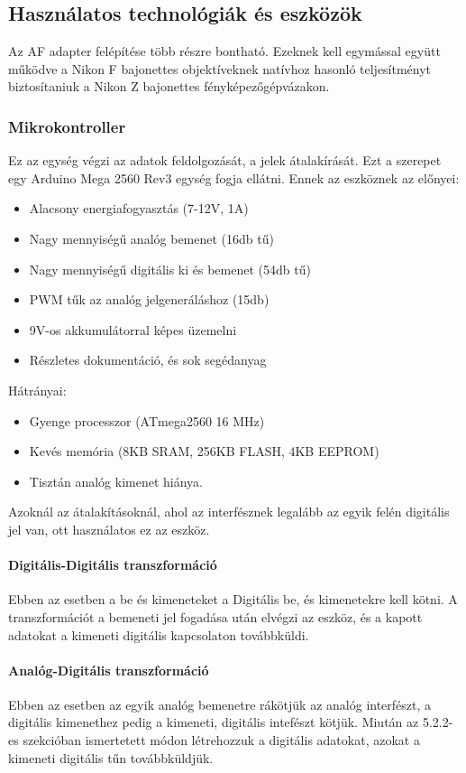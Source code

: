 \subsection{Használatos technológiák és eszközök}
Az AF adapter felépítése több részre bontható. Ezeknek kell egymással együtt működve a Nikon F bajonettes objektíveknek natívhoz hasonló teljesítményt biztosítaniuk a Nikon Z bajonettes fényképezőgépvázakon.

\subsubsection{Mikrokontroller}
Ez az egység végzi az adatok feldolgozását, a jelek átalakírását. Ezt a szerepet egy Arduino Mega 2560 Rev3 egység fogja ellátni\cite{parmar2017design}. Ennek az eszköznek az előnyei:
\begin{itemize}
    \item Alacsony energiafogyasztás (7-12V, 1A)\cite{arduino_docs}
    \item Nagy mennyiségű analóg bemenet (16db tű)\cite{arduino_docs}
    \item Nagy mennyiségű digitális ki és bemenet (54db tű)\cite{arduino_docs}
    \item PWM tűk az analóg jelgeneráláshoz (15db)\cite{arduino_docs}
    \item 9V-os akkumulátorral képes üzemelni \cite{arduino_docs}
    \item Részletes dokumentáció, és sok segédanyag
\end{itemize}
Hátrányai:
\begin{itemize}
    \item Gyenge processzor (ATmega2560 16 MHz)\cite{arduino_docs}
    \item Kevés memória (8KB SRAM, 256KB FLASH, 4KB EEPROM)\cite{arduino_docs}
    \item Tisztán analóg kimenet hiánya.
\end{itemize}
Azoknál az átalakításoknál, ahol az interfésznek legalább az egyik felén digitális jel van, ott használatos ez az eszköz.
\paragraph{Digitális-Digitális transzformáció}
Ebben az esetben a be és kimeneteket a Digitális be, és kimenetekre kell kötni. A transzformációt a bemeneti jel fogadása után elvégzi az eszköz, és a kapott adatokat a kimeneti digitális kapcsolaton továbbküldi.
\paragraph{Analóg-Digitális transzformáció}
Ebben az esetben az egyik analóg bemenetre rákötjük az analóg interfészt, a digitális kimenethez pedig a kimeneti, digitális intefészt kötjük. Miután az 5.2.2-es szekcióban ismertetett módon létrehozzuk a digitális adatokat, azokat a kimeneti digitális tűn továbbküldjük.
